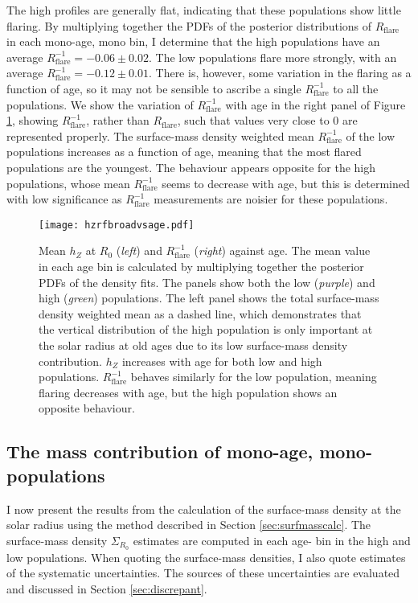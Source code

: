 The high \afe{} profiles are generally flat, indicating that these populations show little flaring. By multiplying together the PDFs of the posterior distributions of $R_{\mathrm{flare}}$ in each mono-age, mono\feh{} bin, I determine that the high \afe{} populations have an average $R_{\mathrm{flare}}^{-1} = -0.06 \pm 0.02$. The low \afe{} populations flare more strongly, with an average $R_{\mathrm{flare}}^{-1} = -0.12 \pm 0.01$. There is, however, some variation in the flaring as a function of age, so it may not be sensible to ascribe a single $R_{\mathrm{flare}}^{-1}$ to all the populations. We show the variation of $R_{\mathrm{flare}}^{-1}$ with age in the right panel of Figure \ref{fig:agevshzrf}, showing $R_{\mathrm{flare}}^{-1}$, rather than $R_{\mathrm{flare}}$, such that values very close to 0 are represented properly. The surface-mass density weighted mean $R_{\mathrm{flare}}^{-1}$ of the low \afe{} populations increases as a function of age, meaning that the most flared populations are the youngest. The behaviour appears opposite for the high \afe{} populations, whose mean $R_{\mathrm{flare}}^{-1}$ seems to decrease with age, but this is determined with low significance as $R_{\mathrm{flare}}^{-1}$ measurements are noisier for these populations.

\begin{figure}
	\texttt{[image: hzrfbroadvsage.pdf]}
    \caption[$h_Z$ and $R_\mathrm{flare}^{-1}$ as a function of age for high and low \afe{} mono-age populations in APOGEE DR12]{ Mean $h_Z$ at $R_0$ (\emph{left}) and $R_{\mathrm{flare}}^{-1}$ (\emph{right}) against age. The mean value in each age bin is calculated by multiplying together the posterior PDFs of the density fits. The panels show both the low (\emph{purple}) and high (\emph{green}) \afe{} populations. The left panel shows the total surface-mass density weighted mean as a dashed line, which demonstrates that the vertical distribution of the high \afe{} population is only important at the solar radius at old ages due to its low surface-mass density contribution. $h_Z$ increases with age for both low and high \afe{} populations. $R_{\mathrm{flare}}^{-1}$ behaves similarly for the low \afe{} population, meaning flaring decreases with age, but the high \afe{} population shows an opposite behaviour.}
     \label{fig:agevshzrf}
\end{figure}

\subsection{The mass contribution of mono-age, mono-\feh{} populations}
\label{sec:surfmassdens}
I now present the results from the calculation of the surface-mass density at the solar radius using the method described in Section \ref{sec:surfmasscalc}. The surface-mass density $\Sigma_{R_0}$ estimates are computed in each age-\feh{} bin in the high and low \afe{} populations. When quoting the surface-mass densities, I also quote estimates of the systematic uncertainties. The sources of these uncertainties are evaluated and discussed in Section \ref{sec:discrepant}.


